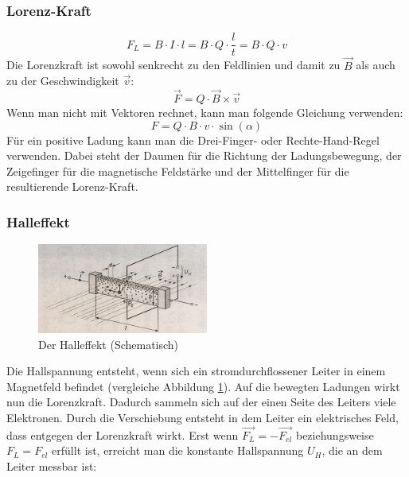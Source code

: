 \documentclass[a4paper]{article}
\begin{document}
			\subsubsection{Lorenz-Kraft}
			
				\begin{equation}
					F_L=B\cdot I \cdot l = B\cdot Q \cdot \frac{l}{t} = B\cdot Q \cdot v
				\end{equation}
				Die Lorenzkraft ist sowohl senkrecht zu den Feldlinien und damit zu $\vec{B}$ als auch zu der Geschwindigkeit $\vec{v}$: 
				\begin{equation}
					\vec{F}=Q\cdot \vec{B}\times\vec{v}
				\end{equation}
				Wenn man nicht mit Vektoren rechnet, kann man folgende Gleichung verwenden:
				\begin{equation}
				F=Q\cdot B\cdot v \cdot \sin(\alpha)
				\end{equation}
				Für ein positive Ladung kann man die Drei-Finger- oder Rechte-Hand-Regel verwenden. Dabei steht der Daumen für die Richtung der Ladungsbewegung, der Zeigefinger für die magnetische Feldstärke und der Mittelfinger für die resultierende Lorenz-Kraft.\
				
				
		\subsubsection{Halleffekt}
		
			\begin{figure}[H]
				\centering
				\includegraphics[width=0.5\textwidth]{img/halleffekt.jpg}
				\caption{Der Halleffekt (Schematisch)}
				\label{img:halleffekt}
			\end{figure}
		
			Die Hallspannung entsteht, wenn sich ein stromdurchflossener Leiter in einem Magnetfeld befindet (vergleiche Abbildung \ref{img:halleffekt}). Auf die bewegten Ladungen wirkt nun die Lorenzkraft. Dadurch sammeln sich auf der einen Seite des Leiters viele Elektronen. Durch die Verschiebung entsteht in dem Leiter ein elektrisches Feld, dass entgegen der Lorenzkraft wirkt. Erst wenn $\vec{F_L} = -\vec{F_{el}}$  beziehungsweise $F_L = F_{el}$ erfüllt ist, erreicht man die konstante Hallspannung $U_H$, die an dem Leiter messbar ist:
			
\end{document}

